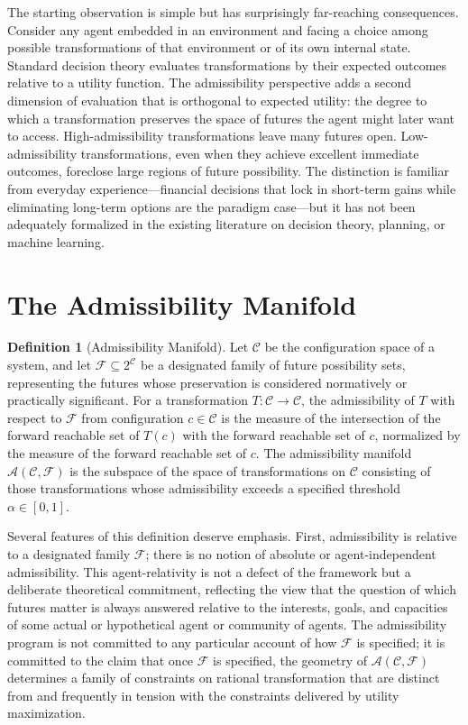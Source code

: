 \documentclass[11pt, oneside]{book}
\theoremstyle{definition}
\newtheorem{definition}{Definition}[chapter]
\theoremstyle{remark}
\begin{document}
The starting observation is simple but has surprisingly far-reaching consequences. Consider any agent embedded in an environment and facing a choice among possible transformations of that environment or of its own internal state. Standard decision theory evaluates transformations by their expected outcomes relative to a utility function. The admissibility perspective adds a second dimension of evaluation that is orthogonal to expected utility: the degree to which a transformation preserves the space of futures the agent might later want to access. High-admissibility transformations leave many futures open. Low-admissibility transformations, even when they achieve excellent immediate outcomes, foreclose large regions of future possibility. The distinction is familiar from everyday experience—financial decisions that lock in short-term gains while eliminating long-term options are the paradigm case—but it has not been adequately formalized in the existing literature on decision theory, planning, or machine learning.

\section{The Admissibility Manifold}

\begin{definition}[Admissibility Manifold]
Let $\mathcal{C}$ be the configuration space of a system, and let $\mathcal{F} \subseteq 2^\mathcal{C}$ be a designated family of future possibility sets, representing the futures whose preservation is considered normatively or practically significant. For a transformation $T : \mathcal{C} \to \mathcal{C}$, the admissibility of $T$ with respect to $\mathcal{F}$ from configuration $c \in \mathcal{C}$ is the measure of the intersection of the forward reachable set of $T(c)$ with the forward reachable set of $c$, normalized by the measure of the forward reachable set of $c$. The admissibility manifold $\mathcal{A}(\mathcal{C}, \mathcal{F})$ is the subspace of the space of transformations on $\mathcal{C}$ consisting of those transformations whose admissibility exceeds a specified threshold $\alpha \in [0,1]$.
\end{definition}

Several features of this definition deserve emphasis. First, admissibility is relative to a designated family $\mathcal{F}$; there is no notion of absolute or agent-independent admissibility. This agent-relativity is not a defect of the framework but a deliberate theoretical commitment, reflecting the view that the question of which futures matter is always answered relative to the interests, goals, and capacities of some actual or hypothetical agent or community of agents. The admissibility program is not committed to any particular account of how $\mathcal{F}$ is specified; it is committed to the claim that once $\mathcal{F}$ is specified, the geometry of $\mathcal{A}(\mathcal{C}, \mathcal{F})$ determines a family of constraints on rational transformation that are distinct from and frequently in tension with the constraints delivered by utility maximization.
\end{document}

